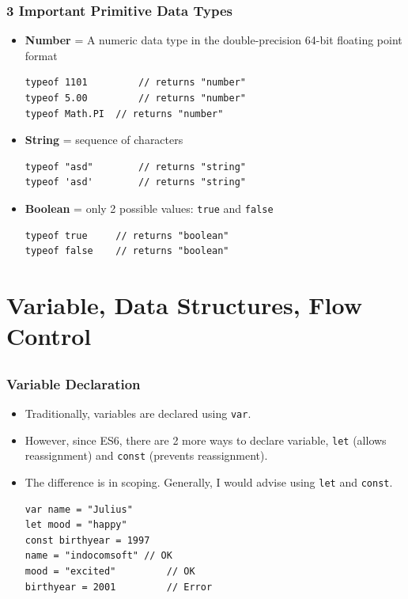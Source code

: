 \documentclass[handout,12pt]{beamer}
\begin{document}
\begin{frame}[fragile]
	\frametitle{3 Important Primitive Data Types}
	\begin{itemize}
		\item \textbf{Number} = A numeric data type in the double-precision 64-bit floating point format
		\begin{verbatim}
typeof 1101			// returns "number"
typeof 5.00			// returns "number"
typeof Math.PI	// returns "number"
		\end{verbatim}
		\item \textbf{String} = sequence of characters
		\begin{verbatim}
typeof "asd"		// returns "string"
typeof 'asd'		// returns "string"
		\end{verbatim}
		\item \textbf{Boolean} = only 2 possible values: \texttt{true} and \texttt{false}
		\begin{verbatim}
typeof true		// returns "boolean"
typeof false	// returns "boolean"
		\end{verbatim}
	\end{itemize}
\end{frame}

\section{Variable, Data Structures, Flow Control}
\subsection{}
\begin{frame}[fragile]
	\frametitle{Variable Declaration}
	\begin{itemize}
		\item Traditionally, variables are declared using \texttt{var}.
		\item However, since ES6, there are 2 more ways to declare variable, \texttt{let} (allows reassignment) and \texttt{const} (prevents reassignment).
		\item The difference is in scoping\footnotemark. Generally, I would advise using \texttt{let} and \texttt{const}.
		\begin{verbatim}
var name = "Julius"
let mood = "happy"
const birthyear = 1997
name = "indocomsoft" // OK
mood = "excited"		 // OK
birthyear = 2001		 // Error
		\end{verbatim}
	\end{itemize}
\end{frame}
\end{document}

